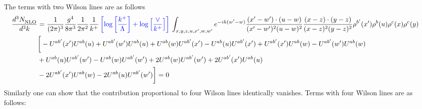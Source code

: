 \documentclass[aps,prd,amsmath,amssymb,nofootinbib]{revtex4-2}
\numberwithin{equation}{section}
\begin{document}
The terms with two Wilson lines are as follows
\begin{align}
    \frac{d^{3}N_{\rm NLO}^{\rm}}{d^{3}k}  & = \frac{1}{(2\pi)^{3}}\frac{g^{4}}{8\pi^{3}}\frac{1}{2\pi^{2}} \frac{1}{k^{+}}\,{\color{blue}\left[\log{\left[\frac{k^{+}}{\Lambda}\right]}+\log{\left[\frac{\vee}{k^{+}}\right]}\right]}\,\int_{x,y,z,u,x^{\prime},w,w^{\prime}}e^{-ik(w^{\prime}-w)}\frac{(x^{\prime}-w^{\prime})\cdot (u-w)}{(x^{\prime}-w^{\prime})^{2} (u-w)^{2}} \frac{(x-z)\cdot (y-z)}{(x-z)^{2}(y-z)^{2}}\rho^{b^{\prime}}(x^{\prime})\rho^{b}(u)\rho^{c}(x)\rho^{c}(y)\notag \\ & \bigg[-U^{ab^{\prime}}(x^{\prime})U^{ab}(u) +U^{ab^{\prime}}(w^{\prime})U^{ab}(u) + U^{ab}(w)U^{ab^{\prime}}(x^{\prime}) - U^{ab}(u)U^{ab^{\prime}}(x^{\prime}) + U^{ab^{\prime}}(x^{\prime})U^{ab}(w) - U^{ab^{\prime}}(w^{\prime})U^{ab}(w) \notag \\ & + U^{ab}(u)U^{ab^{\prime}}(w^{\prime})  - U^{ab}(w)U^{ab^{\prime}}(w^{\prime})+2U^{ab}(w)U^{ab^{\prime}}(w^{\prime}) + 2 U^{ab^{\prime}}(x^{\prime})U^{ab}(u) \notag \\ & -2 U^{ab^{\prime}}(x^{\prime})U^{ab}(w) - 2U^{ab}(u)U^{ab^{\prime}}(w^{\prime})\bigg] = 0 
\end{align}
Similarly one can show that the contribution proportional to four Wilson lines identically vanishes. Terms with four Wilson lines are as follows:
\end{document}
